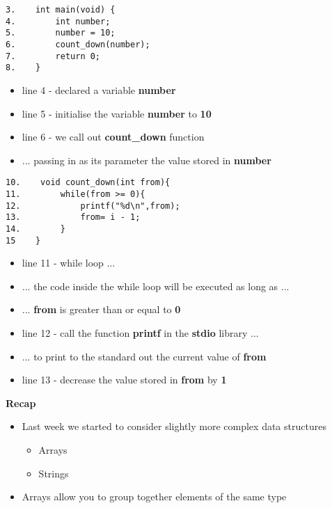 \documentclass{beamer}
\begin{document}
\begin{frame}[fragile]
\begin{block}{}
\begin{lstlisting}
3.    int main(void) {
4.        int number;
5.        number = 10;
6.        count_down(number);
7.        return 0;
8.    }
\end{lstlisting}
\end{block}
\begin{itemize}
\item line 4 - declared a variable \textbf{number}
\item line 5 - initialise the variable \textbf{number} to \textbf{10}
\item line 6 - we call out \textbf{count\_down} function 
\item ... passing in as its parameter the value stored in \textbf{number}
\end{itemize}
\end{frame}

\begin{frame}[fragile]
\begin{block}{}
\begin{lstlisting}
10.    void count_down(int from){
11.        while(from >= 0){
12.            printf("%d\n",from);
13.            from= i - 1;
14.        }
15    }
\end{lstlisting}
\end{block}
\begin{itemize}
\item line 11 - while loop ...
\item ... the code inside the while loop will be executed as long as ... 
\item ... \textbf{from} is greater than or equal to \textbf{0}
\item line 12 - call the function \textbf{printf} in the \textbf{stdio} library ...
\item ... to print to the standard out the current value of \textbf{from}
\item line 13 - decrease the value stored in \textbf{from} by \textbf{1}
\end{itemize}
\end{frame}

\begin{frame}[fragile]
\begin{center}
\textbf{Recap}
\end{center}
\begin{itemize}
\item Last week we started to consider slightly more complex data structures
\begin{itemize}
\item Arrays
\item Strings
\end{itemize}
\bigskip
\item Arrays allow you to group together elements of the same type
\end{itemize}
\end{frame}
\end{document}
